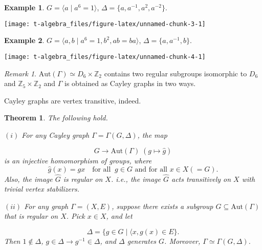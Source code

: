 \documentclass[
]{book}
\newtheorem{theorem}{Theorem}[chapter]
\theoremstyle{definition}
\theoremstyle{definition}
\newtheorem{example}{Example}[chapter]
\theoremstyle{definition}
\theoremstyle{definition}
\theoremstyle{remark}
\newtheorem*{remark}{Remark}
\begin{document}
\begin{example}

\(G = \langle a \mid a^6 = 1\rangle\), \(\Delta = \{a, a^{-1}, a^2, a^{-2}\}\).

\begin{center}\texttt{[image: t-algebra\_files/figure-latex/unnamed-chunk-3-1]} \end{center}

\end{example}

\begin{example}

\(G = \langle a, b \mid a^6 = 1, b^2, ab = ba\rangle\), \(\Delta = \{a, a^{-1}, b\}\).

\begin{center}\texttt{[image: t-algebra\_files/figure-latex/unnamed-chunk-4-1]} \end{center}

\end{example}

\begin{remark}
\(\mathrm{Aut}(\Gamma) \simeq D_6\times \mathbb{Z}_2\) contains two regular subgroups isomorphic to \(D_6\) and \(\mathbb{Z}_5 \times \mathbb{Z}_2\) and \(\Gamma\) is obtained as Cayley graphs in two ways.
\end{remark}

Cayley graphs are vertex transitive, indeed.

\begin{theorem}
The following hold.

\((i)\) For any Cayley graph \(\Gamma = \Gamma(G, \Delta)\), the map

\[G \to \mathrm{Aut}(\Gamma) \; (g\mapsto \hat{g})\]
is an injective homomorphism of groups, where
\[\hat{g}(x) = gx \quad \textrm{for all }\: g\in G \textrm{ and for all } x\in X (= G).\]
Also, the image \(\hat{G}\) is regular on \(X\). i.e., the image \(\hat{G}\) acts transitively on \(X\) with trivial vertex stabilizers.

\((ii)\) For any graph \(\Gamma = (X, E)\), suppose there exists a subgroup \(G \subseteq \mathrm{Aut}(\Gamma)\) that is regular on \(X\). Pick \(x\in X\), and let

\[\Delta = \{g\in G\mid \langle x, g(x)\in E\}.\]
Then \(1\not\in \Delta\), \(g\in \Delta \to g^{-1}\in \Delta\), and \(\Delta\) generates \(G\). Moreover, \(\Gamma \simeq \Gamma(G, \Delta)\).
\end{theorem}
\end{document}
